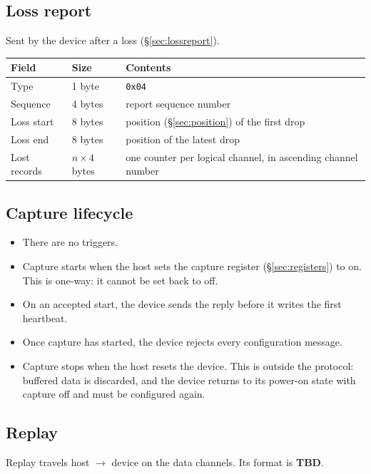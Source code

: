 \documentclass[11pt,a4paper]{article}
\newcommand{\tbd}{\textbf{TBD}}
\newcommand{\sref}[1]{\S\ref{#1}}
\newcommand{\hex}[1]{\texttt{#1}}
\begin{document}
\subsection{Loss report}\label{sec:lossreportmsg}

Sent by the device after a loss (\sref{sec:lossreport}).

\begin{tabularx}{\linewidth}{@{}l l L@{}}
\toprule
\textbf{Field} & \textbf{Size} & \textbf{Contents} \\
\midrule
Type & 1 byte & \hex{0x04} \\
Sequence & 4 bytes & report sequence number \\
Loss start & 8 bytes & position (\sref{sec:position}) of the first drop \\
Loss end & 8 bytes & position of the latest drop \\
Lost records & $n \times 4$ bytes & one counter per logical channel, in ascending channel number \\
\bottomrule
\end{tabularx}

\subsection{Capture lifecycle}\label{sec:lifecycle}

\begin{itemize}
  \item There are no triggers.
  \item Capture starts when the host sets the capture register (\sref{sec:registers}) to
        on. This is one-way: it cannot be set back to off.
  \item On an accepted start, the device sends the reply before it writes the first
        heartbeat.
  \item Once capture has started, the device rejects every configuration message.
  \item Capture stops when the host resets the device. This is outside the protocol:
        buffered data is discarded, and the device returns to its power-on state with
        capture off and must be configured again.
\end{itemize}

\subsection{Replay}\label{sec:replay}

Replay travels host $\to$ device on the data channels. Its format is \tbd{}.
\end{document}
